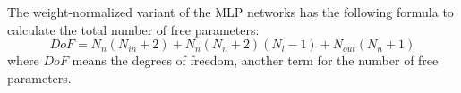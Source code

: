 The weight-normalized variant of the MLP networks has the following formula to calculate the total number of free parameters:
\begin{equation}\label{eq:dof-calculator}
    DoF =
     N_{n} \left(N_{in} + 2\right) + 
    N_{n} \left(N_{n} + 2 \right) \left(N_l-1\right) +
     N_{out}\left(N_{n} + 1\right)
\end{equation}
where $DoF$ means the degrees of freedom, another term for the number of free parameters.
